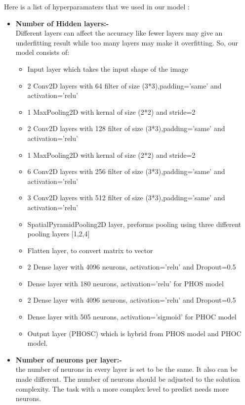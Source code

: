 Here is a list of hyperparamaters that we used in our model :
\begin{itemize}[itemsep=1pt, topsep=5pt]
    \item \textbf{Number of Hidden layers:-}\\
    Different layers can affect the accuracy like fewer layers may give an underfitting result while too many layers may make it overfitting. So, our model consists of:
    \begin{itemize}[itemsep=1pt, topsep=5pt]
    \item Input layer which takes the input shape of the image 
    \item 2 Conv2D layers with 64 filter of size (3*3),padding='same' and  activation='relu' 
    \item 1 MaxPooling2D with kernal of size (2*2) and stride=2 
    \item 2 Conv2D layers with 128 filter of size (3*3),padding='same' and  activation='relu' 
    \item 1 MaxPooling2D with kernal of size (2*2) and stride=2
    \item 6 Conv2D layers with 256 filter of size (3*3),padding='same' and  activation='relu' 
    \item 3 Conv2D layers with 512 filter of size (3*3),padding='same' and  activation='relu'
    \item SpatialPyramidPooling2D layer, preforms pooling using three different pooling layers [1,2,4]  
    \item Flatten layer, to convert matrix to vector 
    \item 2 Dense layer with 4096 neurons, activation='relu' and Dropout=0.5
    \item Dense layer with 180 neurons, activation='relu' for PHOS model
    \item 2 Dense layer with 4096 neurons, activation='relu' and Dropout=0.5  
    \item Dense layer with 505 neurons, activation='sigmoid' for PHOC model
    \item Output layer (PHOSC) which is hybrid  from PHOS model and PHOC model.
\end{itemize} 
    \item \textbf{Number of neurons per layer:-}\\
    the number of neurons in every layer is set to be the same. It also can be made different. The number of neurons should be adjusted to the solution complexity. The task with a more complex level to predict needs more neurons.\\

\end{itemize}
